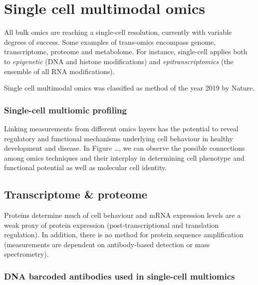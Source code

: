 \graphicspath{{chapters/04/}}
\chapter{Single cell multimodal omics}

All bulk omics are reaching a single-cell resolution, currently with
variable degrees of success. Some examples of trans-omics encompass
genome, transcriptome, proteome and metabolome. For instance,
single-cell applies both to \emph{epigenetic} (DNA and histone
modifications) and \emph{epitranscriptomics} (the ensemble of all RNA
modifications).

Single cell multimodal omics was classified as method of the year 2019
by Nature.

\hypertarget{single-cell-multiomic-profiling}{%
\subsection{Single-cell multiomic
profiling}\label{single-cell-multiomic-profiling}}

Linking measurements from different omics layers has the potential to
reveal regulatory and functional mechanisms underlying cell behaviour in
healthy development and disease. In Figure \ldots, we can observe the
possible connections among omics techniques and their interplay in
determining cell phenotype and functional potential as well as molecular
cell identity.


\hypertarget{transcriptome-proteome}{%
\section{Transcriptome \& proteome}\label{transcriptome-proteome}}

Proteins determine much of cell behaviour and mRNA expression levels are
a weak proxy of protein expression (post-transcriptional and translation
regulation). In addition, there is no method for protein sequence
amplification (measurements are dependent on antibody-based detection or
mass spectrometry).

\hypertarget{dna-barcoded-antibodies-used-in-single-cell-multiomics}{%
\subsection{DNA barcoded antibodies used in
single-cell
multiomics}\label{dna-barcoded-antibodies-used-in-single-cell-multiomics}}

